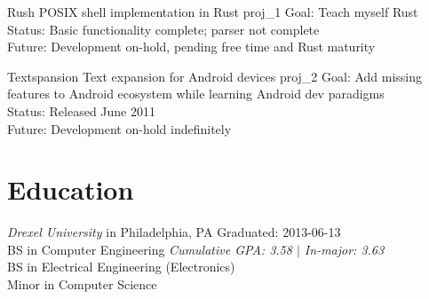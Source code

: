 \documentclass[10pt]{barag_resume}
\begin{document}
    \begin{project}
        {Rush}
        {POSIX shell implementation in Rust}
        {proj_1}
            Goal: Teach myself Rust\\
            Status: Basic functionality complete; parser not complete\\
            Future: Development on-hold, pending free time and Rust maturity
    \end{project}

    \begin{project}
        {Textspansion}
        {Text expansion for Android devices}
        {proj_2}
            Goal: Add missing features to Android ecosystem while learning Android dev paradigms\\
            Status: Released June 2011\\
            Future: Development on-hold indefinitely
    \end{project}

    \newpage %
\section{Education}\relax
    {\large\emph{Drexel University}} {\small in Philadelphia, PA} \hfill Graduated: 2013-06-13\\
    BS in Computer Engineering \hfill \emph{Cumulative GPA: 3.58 $|$ In-major: 3.63}\\
    BS in Electrical Engineering (Electronics)\\
    Minor in Computer Science\\
\end{document}
